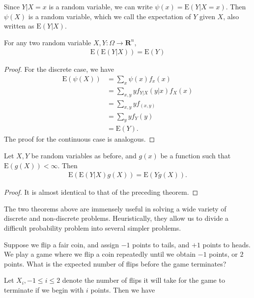 Since $Y|X =x$ is a random variable, we can write $\psi(x) = \mathrm{E}(Y | X =x)$.
Then $\psi(X)$ is a random variable, which we call the expectation of $Y$ given
$X$, also written as $\mathrm{E}(Y|X)$.
\begin{theorem}
	For any two random variable $X,Y: \Omega \to \mathbf{R}^n$,
	\begin{align*}
		\mathrm{E}(\mathrm{E}(Y | X)) = \mathrm{E}(Y)
	\end{align*}
	\begin{proof}
		For the discrete case, we have
		\begin{align*}
			\mathrm{E}(\psi(X)) 
			& = \sum_{x} \psi(x) f_x(x)
			\\
			& = \sum_{x,y} y f_{Y|X}(y|x) f_X(x)
			\\
			& = \sum_{x,y} y f_{(x,y)}
			\\
			& = \sum_y y f_Y(y)
			\\
			& = \mathrm{E}(Y).
		\end{align*}
		The proof for the continuous case is analogous. 
	\end{proof}
\end{theorem}
\begin{theorem}
	Let $X,Y$ be random variables as before, and $g(x)$ be a function such that
	$\mathrm{E}(g(X))< \infty$. Then
	\begin{align*}
		\mathrm{E}(\mathrm{E}(Y|X)g(X)) = \mathrm{E}(Yg(X)).
	\end{align*}
\end{theorem}
\begin{proof}
	It is almost identical to that of the preceding theorem.
\end{proof}
The two theorems above are immensely useful in solving a wide variety of
discrete and non-discrete problems. Heuristically, they allow us to divide a
difficult probability problem into several simpler problems.
\begin{example}
	Suppose we flip a fair coin, and assign $-1$ points to tails, and $+1$ 
	points to
	heads. We play a game where we flip a coin repeatedly until we obtain
	$-1$ points, or $2$ points. What is the expected number of flips before the
	game terminates? 
\end{example}
Let $X_i, -1 \le i \le 2$ denote the number of flips it will take for the game
to terminate if we begin with $i$ points. Then we have

